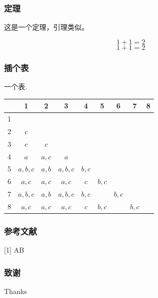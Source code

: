 \documentclass[12pt]{beamer}
\begin{document}
\begin{CJK}{UTF8}{gbsn}
	\begin{frame}
		\frametitle{定理}
		\begin{lemma}[1]
		这是一个定理，引理类似。
		\end{lemma}
		\pause                       %
		\begin{displaymath}             %
		1+1=2
		\end{displaymath}
		\begin{equation}
		1+1=2
		\end{equation}
	\end{frame}

	\begin{frame}\frametitle{插个表}
	一个表.
	 \begin{table}
	  \centering \addtolength{\tabcolsep}{1mm}
	 \begin{tabular}{ccccccccc}
	   \hline
	        & 1 & 2 & 3 & 4 & 5 & 6 & 7 & 8 \\
	   \hline
	    1 &         &       &          &       &       &       &       &  \\
	    2 & $c$     &       &          &       &       &       &       &  \\
	    3 & $c$     & $c $  &          &       &       &       &       &  \\
	    4 & $a$     & $a,c$ & $a $     &       &       &       &       &  \\
		5 & $a,b,c$ & $a,b$ & $a,b,c$  & $b,c$ &       &       &       &  \\
   		6 & $a,c$   & $a,c$ & $a,c$    & $c $  & $b,c$ &       &       &  \\
   		7 & $a,b,c$ & $a,b$ & $a,b,c$  & $b,c$ &       & $b,c$ &       &  \\
   		8 & $a,c$   & $a,c$ & $a,c$    & $c$   & $b,c$ &       & $b,c$ &  \\
   		\hline
		\end{tabular}\label{dismatrix}
		\end{table}
		\end{frame}

	\begin{frame}\frametitle{参考文献}
		[1] A\newline
		[2] B
	\end{frame}

	\begin{frame}\frametitle{致谢}
		Thanks
	\end{frame}

\end{CJK}
\end{document}
